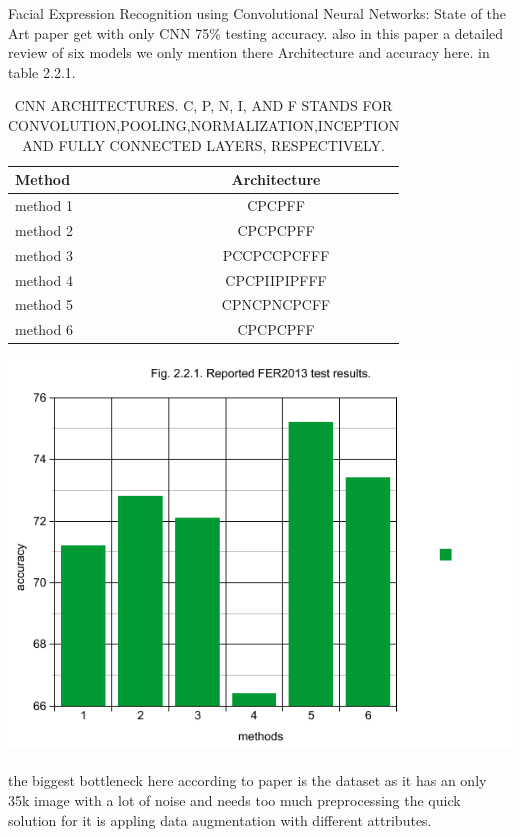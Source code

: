 \large Facial Expression Recognition using Convolutional Neural Networks: State of the Art paper\cite{state_of_art} get with only CNN 75\% testing accuracy.
also in this paper\cite{state_of_art} a detailed review of six models we only mention there Architecture and accuracy here. in table 2.2.1.
\begin{table}[h!]
	\begin{center}
		\caption{CNN ARCHITECTURES. C, P, N, I, AND F STANDS FOR CONVOLUTION,POOLING,NORMALIZATION,INCEPTION AND FULLY CONNECTED LAYERS, RESPECTIVELY. \newline}
		\label{tab:table 2.2.1}
		\begin{tabular}{l|c}
			\textbf{Method} & \textbf{Architecture} \\
			\hline
			method 1\cite{method_1} & CPCPFF \\
			method 2\cite{method_2} & CPCPCPFF \\
			method 3\cite{method_3} & PCCPCCPCFFF \\
			method 4\cite{method_4} & CPCPIIPIPFFF \\
			method 5\cite{method_5} & CPNCPNCPCFF \\						
			method 6\cite{method_6} & CPCPCPFF \\
		\end{tabular}

	\end{center}
		\includegraphics[scale=0.3]{graph.png}
\end{table}
\paragraph{}
\large the biggest bottleneck here according to paper is the dataset as it has an only 35k image with a lot of noise and needs too much preprocessing the quick solution for it is appling data augmentation with different attributes.

